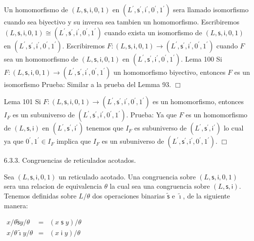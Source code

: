 Un homomorfismo de \((L,\mathsf{s},\mathsf{i},0,1)\) en \((L^{\prime },\mathsf{s}^{\prime },\mathsf{i}^{\prime },0^{\prime },1^{\prime })\) sera llamado isomorfismo cuando sea biyectivo y su inversa sea tambien un homomorfismo. Escribiremos \((L,\mathsf{s},\mathsf{i},0,1)\cong (L^{\prime },\mathsf{s}^{\prime },\mathsf{i}^{\prime },0^{\prime },1^{\prime })\) cuando exista un isomorfismo de \((L,\mathsf{s},\mathsf{i},0,1)\) en \( (L^{\prime },\mathsf{s}^{\prime },\mathsf{i}^{\prime },0^{\prime },1^{\prime })\). Escribiremos \(F:(L,\mathsf{s},\mathsf{i},0,1)\rightarrow (L^{\prime }, \mathsf{s}^{\prime },\mathsf{i}^{\prime },0^{\prime },1^{\prime })\) cuando \( F \) sea un homomorfismo de \((L,\mathsf{s},\mathsf{i,}0,1)\) en \( (L^{\prime },\mathsf{s}^{\prime },\mathsf{i}^{\prime },0^{\prime },1^{\prime })\).
Lema 100 Si \(F:(L,\mathsf{s},\mathsf{i},0,1)\rightarrow (L^{\prime },\mathsf{s} ^{\prime },\mathsf{i}^{\prime },0^{\prime },1^{\prime })\) un homomorfismo biyectivo, entonces \(F\) es un isomorfismo
Prueba: Similar a la prueba del Lemma 93. \(\Box\)

Lema 101 Si \(F:(L,\mathsf{s},\mathsf{i},0,1)\rightarrow (L^{\prime },\mathsf{s} ^{\prime },\mathsf{i}^{\prime },0^{\prime },1^{\prime })\) es un homomorfismo, entonces \(I_{F}\) es un subuniverso de \((L^{\prime },\mathsf{s} ^{\prime },\mathsf{i}^{\prime },0^{\prime },1^{\prime })\).
Prueba: Ya que \(F\) es un homomorfismo de \((L,\mathsf{s},\mathsf{i})\) en \( (L^{\prime },\mathsf{s}^{\prime },\mathsf{i}^{\prime })\) tenemos que \(I_{F}\) es subuniverso de \((L^{\prime },\mathsf{s}^{\prime },\mathsf{i}^{\prime })\) lo cual ya que \(0^{\prime },1^{\prime }\in I_{F}\) implica que \(I_{F}\) es un subuniverso de \((L^{\prime },\mathsf{s}^{\prime },\mathsf{i}^{\prime },0^{\prime },1^{\prime })\). \(\Box\)

6.3.3. Congruencias de reticulados acotados.

Sea \((L,\mathsf{s},\mathsf{i},0,1)\) un reticulado acotado. Una congruencia sobre \((L,\mathsf{s},\mathsf{i},0,1)\) sera una relacion de equivalencia \(\theta \) la cual sea una congruencia sobre \((L,\mathsf{s}, \mathsf{i})\). Tenemos definidas sobre \(L/\theta \) dos operaciones binarias \( \mathsf{\tilde{s}}\) e \(\mathsf{\tilde{\imath}}\), de la siguiente manera:

\(\displaystyle \begin{array}{rcl} x/\theta \mathsf{\tilde{s}}y/\theta & =& (x\mathsf{\;s\;}y)/\theta \\ x/\theta \mathsf{\tilde{\imath}}y/\theta & =& (x\mathsf{\;i\;}y)/\theta \end{array} \)

